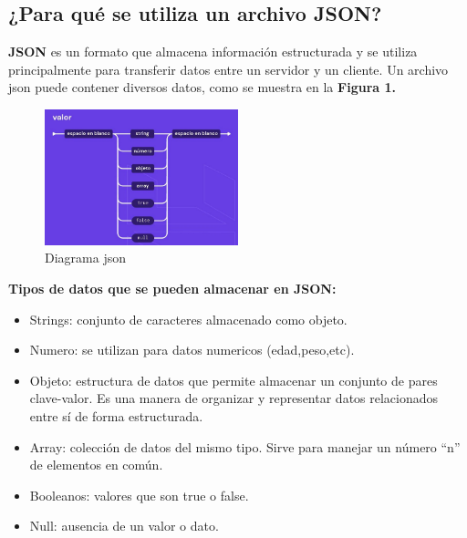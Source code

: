 \subsection*{¿Para qué se utiliza un archivo JSON?} %
\textbf{JSON} es un formato que almacena información estructurada y se utiliza principalmente para transferir datos entre un servidor y un cliente.
Un archivo json puede contener diversos datos, como se muestra en la \textbf{Figura 1.}

\begin{figure}[H]
    \centering %
    \includegraphics[width=0.5\textwidth]{./src/images/json.png} %
    \caption{Diagrama json} %
    \label{fig:imagen} %
\end{figure}
\textbf{Tipos de datos que se pueden almacenar en JSON:}
\begin{itemize}
    \item Strings: conjunto de caracteres almacenado como objeto.
    \item Numero: se utilizan para datos numericos (edad,peso,etc).
    \item Objeto: estructura de datos que permite almacenar un conjunto de pares clave-valor. Es una manera de organizar y representar datos relacionados entre sí de forma estructurada.
    \item Array:  colección de datos del mismo tipo. Sirve para manejar un número “n” de elementos en común.
    \item Booleanos: valores que son true o false.
    \item  Null: ausencia de un valor o dato.
\end{itemize}
\newpage
